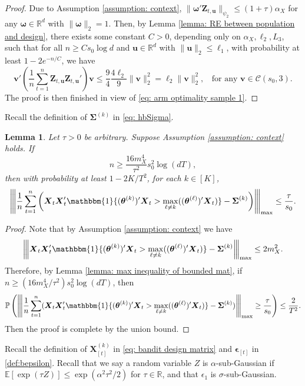 \documentclass[aos,preprint]{imsart}
\theoremstyle{plain}
\newtheorem{lemma}[theorem]{Lemma}
\theoremstyle{definition}
\newcommand{\btheta}{\boldsymbol{\theta}}
\newcommand{\bd}[1]{\boldsymbol{#1}}
\newcommand{\idf}{\mathbbm{1}}
\newcommand{\bX}{\boldsymbol{X}}
\newcommand{\bSigma}{\boldsymbol{\Sigma}}
\newcommand{\op}[1]{{\left\vert\kern-0.25ex\left\vert\kern-0.25ex\left\vert #1\right\vert\kern-0.25ex\right\vert\kern-0.25ex\right\vert}}
\newcommand{\mR}{\mathbb{R}}
\newcommand{\bu}{\boldsymbol{u}}
\newcommand{\bv}{\boldsymbol{v}}
\newcommand{\bZ}{\boldsymbol{Z}}
\newcommand{\bepsilon}{\bd{\epsilon}}
\newcommand{\bR}{\mathbb{R}}
\newcommand{\Exp}{\mathbb{E}}
\newcommand{\Pro}{\mathbb{P}}
\begin{document}
\begin{appendix}
\begin{proof}
Due to Assumption \ref{assumption: context},
$\|\bd{\omega}'\bZ_{t,\bu}\|_{\psi_2} \leq (1+\tau)\alpha_X$ for any $\bd{\omega} \in \bR^d$ with $\|\bd{\omega}\|_2 = 1$. Then, by Lemma \ref{lemma: RE between population and design}, there exists some constant $C > 0$, depending only on $\alpha_X, \ell_2, L_3$, such that for all $n\ge Cs_0\log d$ and  $\bu\in \mR^d$ with $\|\bu\|_2\le \ell_1$, with probability at least $1-2e^{-n/C}$,  we have
$$
\bv'\left(\frac{1}{n}\sum_{t=1}^n\bZ_{t,\bu}\bZ_{t,\bu}'\right)\bv \le \frac{9}{4}\frac{4\ell_2}{9}\|\bv\|_2^2 = \ell_2\|\bv\|_2^2, \;\;\text{ for any }\bv\in\mathcal{C}(s_0,3).
$$
The proof is then finished in view of \eqref{eq: arm optimality sample 1}.
\end{proof}

Recall the definition of $\bSigma^{(k)}$ in \eqref{eq: hbSigma}.

\begin{lemma}\label{lemma: event D_2}
Let $\tau > 0$ be arbitrary. Suppose  Assumption \ref{assumption: context} holds. If 
$$n \geq \frac{16m_X^4}{\tau^2} s_0^2 \log(dT),$$ 
then with probability at least $1-2K/T^2$, for each $k \in [K]$, 
$$\op{\frac{1}{n}\sum_{t=1}^{n} \left(\bX_t\bX_t'\idf\{(\btheta^{(k)})'\bX_t>\max_{\ell \neq k}((\btheta^{(\ell)})'\bX_t)\}-\bSigma^{(k)}\right) }_{\textup{max}} \le \frac{\tau}{s_0}.$$
\end{lemma}
\begin{proof}
Note that by Assumption \ref{assumption: context} we have 
$$\op{\bX_t\bX_t'\idf\{(\btheta^{(k)})'\bX_t>\max_{\ell \neq k}((\btheta^{(\ell)})'\bX_t)\}-\bSigma^{(k)}}_{\textup{max}} \le 2m_X^2.$$
Therefore, by Lemma \ref{lemma: max inequality of bounded mat}, if $n \geq (16m_X^4/\tau^2) s_0^2 \log(dT)$, then  
\begin{equation*}
   \Pro\left(  \op{\frac{1}{n}\sum_{t=1}^{n} (\bX_t\bX_t'\idf\{(\btheta^{(k)})'\bX_t>\max_{\ell \neq k}((\btheta^{(\ell)})'\bX_t)\}-\bSigma^{(k)}) }_{\textup{max}} 
     \ge \frac{\tau}{s_0} \right) \leq \frac{2}{T^2}.
\end{equation*}
Then the proof is complete by the union bound.
\end{proof}


Recall the definition of $\bX_{[t]}^{(k)}$ in \eqref{eq: bandit design matrix} and $\bepsilon_{[t]}$ in \eqref{def:bepsilon}. Recall that we say a random variable $Z$ is $\alpha$-sub-Gaussian if $\Exp[\exp(\tau Z)] \leq \exp(\alpha^2\tau^2/2)$ for $\tau \in \bR$, and that $\epsilon_1$ is $\sigma$-sub-Gaussian. 


\end{appendix}
\end{document}
